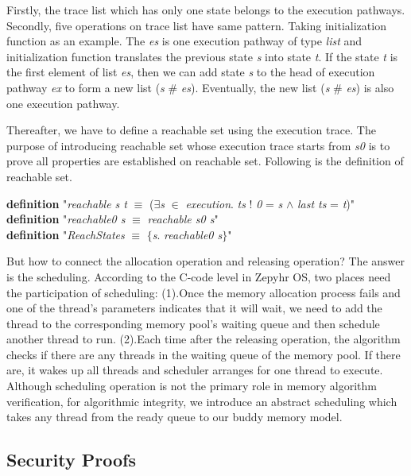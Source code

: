 \documentclass[runningheads]{llncs}
\begin{document}
Firstly, the trace list which has only one state belongs to the execution pathways. Secondly, five operations on trace list have same pattern. Taking initialization function as an example. The \textsl{es} is one execution pathway of type \textsl{list} and initialization function translates the previous state \textsl{s} into state \textsl{t}. If the state \textsl{t} is the first element of list \textsl{es}, then we can add state \textsl{s} to the head of execution pathway \textsl{ex} to form a new list (\textsl{s} \# \textsl{es}). Eventually, the new list (\textsl{s} \# \textsl{es}) is also one execution pathway.

Thereafter, we have to define a reachable set using the execution trace. The purpose of introducing reachable set whose execution trace starts from \textsl{s0} is to prove all properties are established on reachable set. Following is the definition of reachable set.

\phantom{x} \textbf{definition} "\textsl{reachable s t} $\equiv$ ($\exists$\textsl{s} $\in$ \textsl{execution}. \textsl{ts} ! \textsl{0} = \textsl{s} $\wedge$ \textsl{last ts} = \textsl{t})" \\
\phantom{x} \hspace{3pt} \textbf{definition} "\textsl{reachable0 s} $\equiv$ \textsl{reachable s0 s}" \\
\phantom{x} \hspace{3pt} \textbf{definition} "\textsl{ReachStates} $\equiv$ $\lbrace$\textsl{s}. \textsl{reachable0 s}$\rbrace$"

But how to connect the allocation operation and releasing operation? The answer is the scheduling. According to the C-code level in Zepyhr OS, two places need the participation of scheduling: (1).Once the memory allocation process fails and one of the thread's parameters indicates that it will wait, we need to add the thread to the corresponding memory pool's waiting queue and then schedule another thread to run. (2).Each time after the releasing operation, the algorithm checks if there are any threads in the waiting queue of the memory pool. If there are, it wakes up all threads and scheduler arranges for one thread to execute. Although scheduling operation is not the primary role in memory algorithm verification, for algorithmic integrity, we introduce an abstract scheduling which takes any thread from the ready queue to our buddy memory model.


\subsection{Security Proofs}
\end{document}

